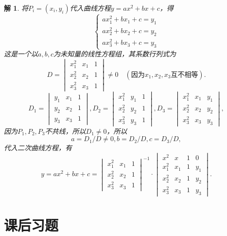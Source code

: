 \documentclass[a4paper]{book}
\newtheorem*{solution}{解}
\begin{document}
\begin{solution}
将$P_i = (x_i ,y_i)$代入曲线方程$y = ax^2+bx+c$，得
$$\begin{cases}
ax_1^2 + bx_1 + c = y_1 \\
ax_2^2 + bx_2 + c = y_2 \\
ax_3^2 + bx_3 + c = y_3
\end{cases}$$
这是一个以$a, b, c$为未知量的线性方程组，其系数行列式为
$$D = \begin{vmatrix} x_1^2 & x_1 & 1 \\ x_2^2 & x_2 & 1 \\ x_3^2 & x_3 & 1 \end{vmatrix} \neq 0 \quad(\text{因为$x_1, x_2, x_3$互不相等}).$$
$$D_1 = \begin{vmatrix} y_1 & x_1 & 1 \\ y_2 & x_2 & 1 \\ y_3 & x_3 & 1 \end{vmatrix},
D_2 = \begin{vmatrix} x_1^2 & y_1 & 1 \\ x_2^2 & y_2 & 1 \\ x_3^2 & y_3 & 1 \end{vmatrix},
D_3 = \begin{vmatrix} x_1^2 & x_1 & y_1 \\ x_2^2 & x_2 & y_2 \\ x_3^2 & x_3 & y_3 \end{vmatrix},$$
因为$P_1, P_2, P_3$不共线，所以$D_1\neq 0$，所以
$$a = D_1/D\neq 0, b = D_2/D, c = D_3/D,$$
代入二次曲线方程，有
$$y = ax^2+bx+c = \begin{vmatrix} x_1^2 & x_1 & 1 \\ x_2^2 & x_2 & 1 \\ x_3^2 & x_3 & 1 \end{vmatrix}^{-1}\cdot\begin{vmatrix} x^2 & x & 1 & 0 \\ x_1^2 & x_1 & 1 & y_1 \\ x_2^2 & x_2 & 1 & y_2 \\ x_3^2 & x_3 & 1 & y_3 \end{vmatrix}.$$
\end{solution}


\section{课后习题}
\end{document}
